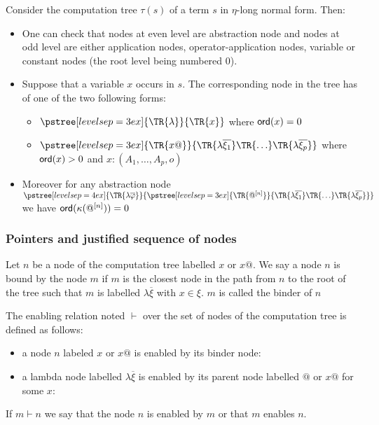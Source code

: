 Consider the computation tree $\tau(s)$ of a term $s$ in $\eta$-long normal form. Then:
\begin{itemize}
\item One can check that nodes at even level are abstraction
node and nodes at odd level are either application nodes,
operator-application nodes, variable or constant nodes (the root level being numbered $0$).

\item Suppose that a variable $x$ occurs in $s$. The corresponding node in the tree has of one of the two following forms:
    \begin{itemize}
    \item $ \pstree[levelsep=3ex]
        { \TR{\lambda } }
        { \TR{x}
        }$ where ${\sf ord}(x) = 0$

    \item $ \pstree[levelsep=3ex]
                { \TR{x @} }
                { \TR{\lambda \overline{\xi_1}} \TR{\ldots} \TR{\lambda \overline{\xi_p}}}
        $ where ${\sf ord}(x) > 0$ and $x:(A_1,\ldots,A_p,o)$
    \end{itemize}

\item    Moreover for any abstraction node
        $ \pstree[levelsep=4ex]
            { \TR{\lambda \overline{\varphi}} }
            { \pstree[levelsep=3ex]
                {\TR{@^{[n]}}}
                {\TR{\lambda \overline{\xi_1}} \TR{\ldots} \TR{\lambda \overline{\xi_p}}}
            }
        $
    we have ${\sf ord}(\kappa(@^{[n]}))=0$

\end{itemize}


\subsubsection{Pointers and justified sequence of nodes}

\begin{dfn}[Binder]
Let $n$ be a node of the computation tree labelled $x$ or $x@$.
We say a node $n$ is bound by the node $m$ if $m$ is
the closest node in the path from $n$ to the root of the tree such that
$m$ is labelled $\lambda \overline{\xi}$ with $x\in \xi$.
$m$ is called the binder of $n$
\end{dfn}

\begin{dfn}[Enabling]
The enabling relation noted $\vdash$ over the set of nodes of the computation tree is defined as follows:
\begin{itemize}
\item a node $n$ labeled $x$ or $x@$ is enabled by its binder node:
\item a lambda node labelled $\lambda \overline{\xi}$ is enabled by its parent node labelled $@$ or $x@$ for some $x$:
\end{itemize}
If $m \vdash n$ we say that the node $n$ is enabled by $m$ or that $m$ enables $n$.
\end{dfn}



